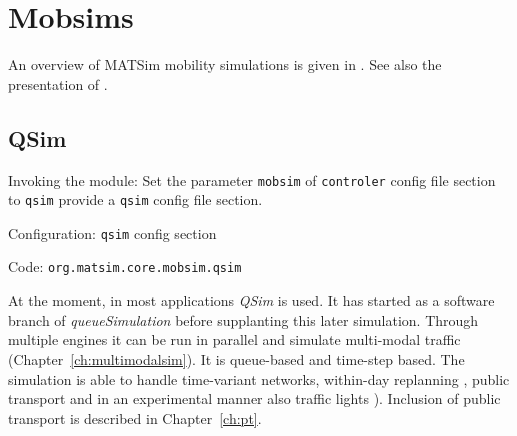 

\section{Mobsims}
\label{sec:mobsims}
An overview of MATSim mobility simulations is given in \citet[][]{Dobler_TechRep_IVT_2011}. See also the presentation of \citet[][]{Rieser_unpub_IVT_2011}.

\subsection{QSim}
\label{sec:qsim}
\begin{compactitem}
\item Invoking the module: Set the parameter \lstinline|mobsim| of \lstinline|controler| config file section to \lstinline|qsim| provide a \lstinline|qsim| config file section.
\item Configuration: \lstinline|qsim| config section
\item Code: \lstinline|org.matsim.core.mobsim.qsim|
\end{compactitem}

At the moment, in most applications \emph{QSim} \citep[][]{Dobler_TechRep_IVT_2011, Dobler_STRC_2010} is used. It has started as a software branch of \emph{queueSimulation} before supplanting this later simulation. Through multiple engines it can be run in parallel and simulate multi-modal traffic (Chapter~\ref{ch:multimodalsim}). It is queue-based and time-step based. The simulation is able to handle time-variant networks, within-day replanning \citep[][]{Dobler_TechRep_IVT_2009}, public transport \citep[][]{Rieser_PhDThesis_2010} and in an experimental manner also traffic lights \citep[][]{Neumann_MastersThesis_2008}). Inclusion of public transport is described in Chapter~\ref{ch:pt}.

